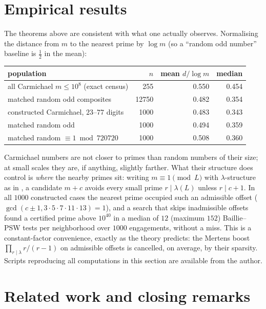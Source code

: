 \documentclass[11pt]{amsart}
\begin{document}
\section{Empirical results}
\label{sec:empirical}

The theorems above are consistent with what one actually observes.
Normalising the distance from $m$ to the nearest prime by $\log m$
(so a ``random odd number'' baseline is $\tfrac12$ in the mean):

\begin{center}
\begin{tabular}{lrrr}
\toprule
population & $n$ & mean $d/\log m$ & median \\
\midrule
all Carmichael $m \le 10^8$ (exact census) & 255 & 0.550 & 0.454 \\
\quad matched random odd composites & 12750 & 0.482 & 0.354 \\
\addlinespace
constructed Carmichael, $23$--$77$ digits & 1000 & 0.483 & 0.343 \\
\quad matched random odd & 1000 & 0.494 & 0.359 \\
\quad matched random $\equiv 1 \bmod 720720$ & 1000 & 0.508 & 0.360 \\
\bottomrule
\end{tabular}
\end{center}

\smallskip
Carmichael numbers are not closer to primes than random numbers of their size;
at small scales they are, if anything, slightly farther. What their structure
does control is \emph{where} the nearby primes sit: writing $m \equiv 1
\pmod{L}$ with $\lambda$-structure as in \cite{Bro}, a candidate $m + c$
avoids every small prime $r \mid \lambda(L)$ unless $r \mid c + 1$. In all
$1000$ constructed cases the nearest prime occupied such an admissible offset
($\gcd(c \pm 1, 3\cdot5\cdot7\cdot11\cdot13) = 1$), and a search that skips
inadmissible offsets found a certified prime above $10^{40}$ in a median of
$12$ (maximum $152$) Baillie--PSW tests per neighborhood over $1000$
engagements, without a miss. This is a constant-factor convenience, exactly as the
theory predicts: the Mertens boost $\prod_{r \mid \lambda} r/(r-1)$ on
admissible offsets is cancelled, on average, by their sparsity. Scripts
reproducing all computations in this section are available from the author.

\section{Related work and closing remarks}
\label{sec:related}
\end{document}
